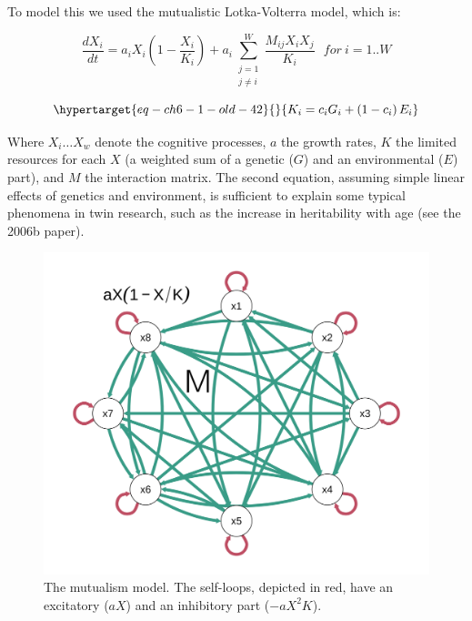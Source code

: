 \documentclass[
  a4paper,
  DIV=11,
  numbers=noendperiod]{scrreprt}
\begin{document}
To model this we used the mutualistic Lotka-Volterra model, which is:

\[\frac{dX_{i}}{dt} = a_{i}X_{i}\left( 1 - \frac{X_{i}}{K_{i}} \right) + a_{i}\sum_{\begin{array}{r}
j = 1 \\
j \neq i
\end{array}}^{W}\frac{M_{ij}X_{i}X_{j}}{K_{i}}\ \ \ for\ i = 1..W\]

\begin{equation}\protect\hypertarget{eq-ch6-1-old-42}{}{
K_{i} = c_{i}G_{i} + \left( 1 - c_{i} \right)E_{i}
}\label{eq-ch6-1-old-42}\end{equation}

Where \(X_{i} \ldots X_{w}\) denote the cognitive processes, \(a\) the
growth rates, \(K\) the limited resources for each \(X\) (a weighted sum
of a genetic (\(G\)) and an environmental (\(E\)) part), and \(M\) the
interaction matrix. The second equation, assuming simple linear effects
of genetics and environment, is sufficient to explain some typical
phenomena in twin research, such as the increase in heritability with
age (see the 2006b paper).

\begin{figure}

{\centering \includegraphics{media/ch6/fig-ch6-img6-old-75.png}

}

\caption{\label{fig-ch6-img6-old-75}The mutualism model. The self-loops,
depicted in red, have an excitatory (\(aX\)) and an inhibitory part
(\(- aX^{2}K\)).}

\end{figure}
\end{document}
